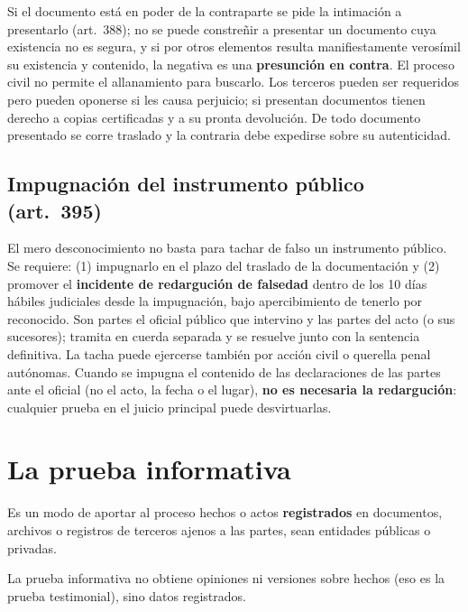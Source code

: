 \documentclass[12pt,oneside]{book}
\begin{document}
Si el documento está en poder de la contraparte se pide la intimación a presentarlo (art.~388); no se puede constreñir a presentar un documento cuya existencia no es segura, y si por otros elementos resulta manifiestamente verosímil su existencia y contenido, la negativa es una \textbf{presunción en contra}. El proceso civil no permite el allanamiento para buscarlo. Los terceros pueden ser requeridos pero pueden oponerse si les causa perjuicio; si presentan documentos tienen derecho a copias certificadas y a su pronta devolución. De todo documento presentado se corre traslado y la contraria debe expedirse sobre su autenticidad.

\subsection{Impugnación del instrumento público (art.~395)}

El mero desconocimiento no basta para tachar de falso un instrumento público. Se requiere: (1) impugnarlo en el plazo del traslado de la documentación y (2) promover el \textbf{incidente de redargución de falsedad} dentro de los 10 días hábiles judiciales desde la impugnación, bajo apercibimiento de tenerlo por reconocido. %
Son partes el oficial público que intervino y las partes del acto (o sus sucesores); tramita en cuerda separada y se resuelve junto con la sentencia definitiva. La tacha puede ejercerse también por acción civil o querella penal autónomas. Cuando se impugna el contenido de las declaraciones de las partes ante el oficial (no el acto, la fecha o el lugar), \textbf{no es necesaria la redargución}: cualquier prueba en el juicio principal puede desvirtuarlas.

\section{La prueba informativa}

Es un modo de aportar al proceso hechos o actos \textbf{registrados} en documentos, archivos o registros de terceros ajenos a las partes, sean entidades públicas o privadas.

\begin{importante}
La prueba informativa no obtiene opiniones ni versiones sobre hechos (eso es la prueba testimonial), sino datos registrados.
\end{importante}
\end{document}
